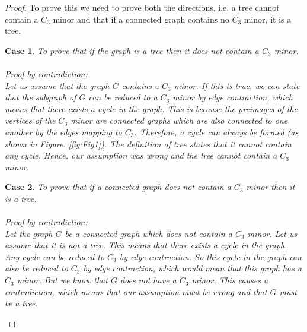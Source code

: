 \documentclass{article}
\newtheorem{case}{Case}
\begin{document}
\begin{proof}
    To prove this we need to prove both the directions, i.e. a tree cannot contain a $C_{3}$ minor and that if a connected graph contains no $C_{3}$ minor, it is a tree.

    \begin{case}
To prove that if the graph is a tree then it does not contain a $C_3$ minor.\\
\\
Proof by contradiction: \\
Let us assume that the graph $G$ contains a $C_3$ minor. If this is true, we can state that the subgraph of $G$ can be reduced to a $C_3$ minor by edge contraction, which means that there exists a cycle in the graph. This is because the preimages of the vertices of the $C_{3}$ minor are connected graphs which are also connected to one another by the edges mapping to $C_{3}$. Therefore, a cycle can always be formed (as shown in Figure. \ref{fig:Fig1}). The definition of tree states that it cannot contain any cycle. Hence, our assumption was wrong and the tree cannot contain a $C_{3}$ minor. \\
    \end{case}

    \begin{case}
        To prove that if a connected graph does not contain a $C_{3}$ minor then it is a tree.\\
\\Proof by contradiction: 
\\
Let the graph $G$ be a connected graph which does not contain a $C_{3}$ minor. Let us assume that it is not a tree. This means that there exists a cycle in the graph. Any cycle can be reduced to $C_{3}$ by edge contraction. So this cycle in the graph can also be reduced to $C_{3}$ by edge contraction, which would mean that this graph has a $C_{3}$ minor. But we know that $G$ does not have a $C_{3}$ minor. This causes a contradiction, which means that our assumption must be wrong and that $G$ must be a tree.

\end{case}

\begin{figure}[h!]
\begin{center}
    

\begin{tikzpicture}[x=0.75pt,y=0.75pt,yscale=-1,xscale=1]


\end{tikzpicture}
\end{center}
\end{figure}
\end{proof}
\end{document}
